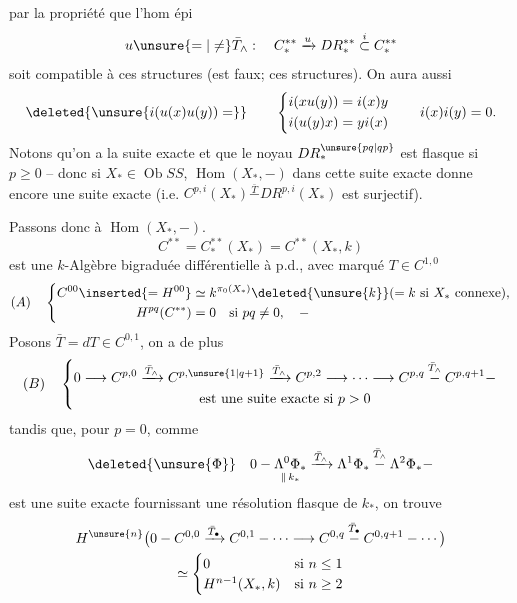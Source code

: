 par la propriété que l'hom épi
\[
u\unsure{=|\ne}\bar T_\wedge:\quad C_*^{**}\xrightarrow{u}DR_*^{**}\overset{i}{\subset}C_*^{**}
\]
soit compatible à ces structures (est faux;  \uline{} ces structures).
On aura aussi
\[
\deleted{\unsure{i(u(x)u(y))=}}\qquad
\left\{\begin{aligned}
i(xu(y))&=i(x)y\\
i(u(y)x)&=yi(x)
\end{aligned}\right.
\qquad i(x)i(y)=0 .
\]
Notons qu'on a la suite exacte
et que le noyau $DR_*^{\unsure{pq|qp}}$ est flasque si $p\geq0$ --
donc si $X_*\in\operatorname{Ob}SS$, $\operatorname{Hom}(X_*,-)$ dans cette suite exacte donne encore une suite exacte
(i.e.  $C^{p,i}(X_*)\overset{\bar T}{-}DR^{p,i}(X_*)$ est surjectif).

Passons donc à $\operatorname{Hom}(X_*,-)$.
\[
C^{**}=C_*^{**}(X_*)=C^{**}(X_*,k)
\]
est une $k$-Algèbre bigraduée différentielle à p.d., avec  marqué $T\in C^{1,0}$
\[
(A)\quad
\left\{\begin{aligned}
C^{00}\inserted{=H^{00}}&\simeq k^{\pi_0(X_*)}\deleted{\unsure{k}}(=k\text{ si }X_*\text{ connexe}),\\
H^{pq}(C^{**})&=0\quad\text{si }pq\ne0,\quad -
\end{aligned}\right.
\]
Posons $\bar T=dT\in C^{0,1}$, on a de plus
\[
(B)\quad\left\{\begin{gathered}
0\longrightarrow C^{p,0}\xrightarrow{\bar T_\wedge}C^{p,\unsure{1|q+1}}
\xrightarrow{\bar T_\wedge}C^{p,2}\longrightarrow\cdots
\longrightarrow C^{p,q}\overset{\bar T_\wedge}{-}C^{p,q+1}-\\
\text{est une suite exacte si }p>0
\end{gathered}\right.
\]
tandis que, pour $p=0$, comme
\[
\deleted{\unsure{\Phi}}\quad
0-\underset{\Vert\,k_*}{\Lambda^0\Phi_*}
\xrightarrow{\bar T_\wedge}\Lambda^1\Phi_*
\overset{\bar T_\wedge}{-}\Lambda^2\Phi_*-
\]
est une suite exacte fournissant une résolution flasque de $k_*$, on trouve
\[
\begin{gathered}
H^{\unsure{n}}\bigl(0-C^{0,0}\xrightarrow{\bar T_\bullet}C^{0,1}
-\cdots\longrightarrow C^{0,q}\overset{\bar T_\bullet}{-}C^{0,q+1}-\cdots\bigr)\\
\simeq\begin{cases}
0&\text{si }n\leq1\\
H^{n-1}(X_*,k)&\text{si }n\geq2
\end{cases}
\end{gathered}
\]
